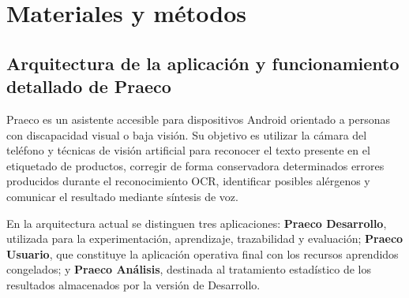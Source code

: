 
\chapter{Materiales y métodos}

\section{Arquitectura de la aplicación y funcionamiento detallado de Praeco}

Praeco es un asistente accesible para dispositivos Android orientado a personas con discapacidad visual o baja visión. Su objetivo es utilizar la cámara del teléfono y técnicas de visión artificial para reconocer el texto presente en el etiquetado de productos, corregir de forma conservadora determinados errores producidos durante el reconocimiento OCR, identificar posibles alérgenos y comunicar el resultado mediante síntesis de voz.

En la arquitectura actual se distinguen tres aplicaciones: \textbf{Praeco Desarrollo}, utilizada para la experimentación, aprendizaje, trazabilidad y evaluación; \textbf{Praeco Usuario}, que constituye la aplicación operativa final con los recursos aprendidos congelados; y \textbf{Praeco Análisis}, destinada al tratamiento estadístico de los resultados almacenados por la versión de Desarrollo.

